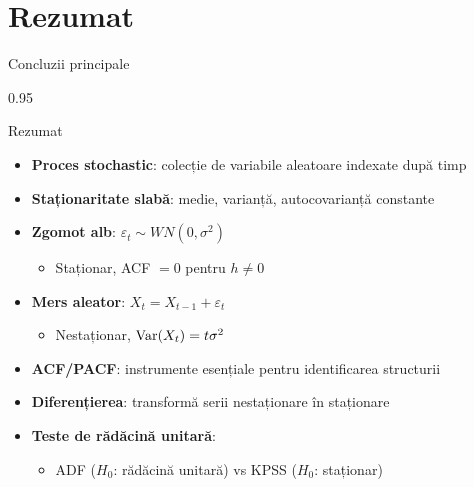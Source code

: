 \documentclass[9pt, aspectratio=169, t]{beamer}
\begin{document}
\section{Rezumat}

\begin{frame}{Concluzii principale}
    \begin{cminipage}{0.95\textwidth}
        \begin{block}{Rezumat}
            \small
            \begin{itemize}\setlength{\itemsep}{0pt}
                \item \textbf{Proces stochastic}: colecție de variabile aleatoare indexate după timp
                \item \textbf{Staționaritate slabă}: medie, varianță, autocovarianță constante
                \item \textbf{Zgomot alb}: $\varepsilon_t \sim WN(0, \sigma^2)$
                \begin{itemize}
                    \item Staționar, ACF $= 0$ pentru $h \neq 0$
                \end{itemize}
                \item \textbf{Mers aleator}: $X_t = X_{t-1} + \varepsilon_t$
                \begin{itemize}
                    \item Nestaționar, $\text{Var}(X_t) = t\sigma^2$
                \end{itemize}
                \item \textbf{ACF/PACF}: instrumente esențiale pentru identificarea structurii
                \item \textbf{Diferențierea}: transformă serii nestaționare în staționare
                \item \textbf{Teste de rădăcină unitară}:
                \begin{itemize}
                    \item ADF ($H_0$: rădăcină unitară) vs KPSS ($H_0$: staționar)
                \end{itemize}
            \end{itemize}
        \end{block}
    \end{cminipage}
\end{frame}
\end{document}

